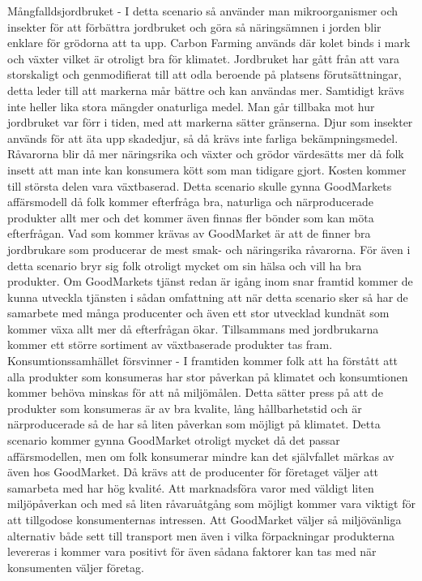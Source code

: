 \documentclass[10pt,a4paper,oneside]{article}
\begin{document}
Mångfalldsjordbruket - I detta scenario så använder man mikroorganismer och insekter för att förbättra jordbruket och göra så näringsämnen i jorden blir enklare för grödorna att ta upp. Carbon Farming används där kolet binds i mark och växter vilket är otroligt bra för klimatet. Jordbruket har gått från att vara storskaligt och genmodifierat till att odla beroende på platsens förutsättningar, detta leder till att markerna mår bättre och kan användas mer. Samtidigt krävs inte heller lika stora mängder onaturliga medel. Man går tillbaka mot hur jordbruket var förr i tiden, med att markerna sätter gränserna. Djur som insekter används för att äta upp skadedjur, så då krävs inte farliga bekämpningsmedel.  Råvarorna blir då mer näringsrika och växter och grödor värdesätts mer då folk insett att man inte kan konsumera kött som man tidigare gjort. Kosten kommer till största delen vara växtbaserad. Detta scenario skulle gynna GoodMarkets affärsmodell då folk kommer efterfråga bra, naturliga och närproducerade produkter allt mer och det kommer även finnas fler bönder som kan möta efterfrågan. Vad som kommer krävas av GoodMarket är att de finner bra jordbrukare som producerar de mest smak- och näringsrika råvarorna. För även i detta scenario bryr sig folk otroligt mycket om sin hälsa och vill ha bra produkter. Om GoodMarkets tjänst redan är igång inom snar framtid kommer de kunna utveckla tjänsten i sådan omfattning att när detta scenario sker så har de samarbete med många producenter och även ett stor utvecklad kundnät som kommer växa allt mer då efterfrågan ökar. Tillsammans med jordbrukarna kommer ett större sortiment av växtbaserade produkter tas fram. \\

Konsumtionssamhället försvinner - I framtiden kommer folk att ha förstått att alla produkter som konsumeras har stor påverkan på klimatet och konsumtionen kommer behöva minskas för att nå miljömålen. Detta sätter press på att de produkter som konsumeras är av bra kvalite, lång hållbarhetstid och är närproducerade så de har så liten påverkan som möjligt på klimatet. Detta scenario kommer gynna GoodMarket otroligt mycket då det passar affärsmodellen, men om folk konsumerar mindre kan det självfallet märkas av även hos GoodMarket. Då krävs att de producenter för företaget väljer att samarbeta med har hög kvalité. Att marknadsföra varor med väldigt liten miljöpåverkan och med så liten råvaruåtgång som möjligt kommer vara viktigt för att tillgodose konsumenternas intressen. Att GoodMarket väljer så miljövänliga alternativ både sett till transport men även i vilka förpackningar produkterna levereras i kommer vara positivt för även sådana faktorer kan tas med när konsumenten väljer företag. 
\end{document}
